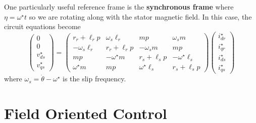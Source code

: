 \documentclass[onecolumn]{gwclass}
\begin{document}
One particularly useful reference frame is the \textbf{synchronous frame} where $\eta=\omega^\star t$ so we are rotating along with the stator magnetic field. In this case, the circuit equations become
$$ \begin{pmatrix}
	0 \\
	0\\
	v_{ds}^\star \\
	v_{qs}^\star
\end{pmatrix} = 
\begin{pmatrix}
	r_r + \ell_r p & \omega_s\ell_r & mp & \omega_sm \\
	-\omega_s \ell_r & r_r + \ell_r p & -\omega_s m & mp \\
  mp & -\omega^\star m & 	r_s + \ell_sp & -\omega^\star\ell_s\\
	\omega^\star m & mp & \omega^\star\ell_s & r_s + \ell_s p
\end{pmatrix}\begin{pmatrix}
	i_{dr}^\star\\
	i_{qr}^\star\\
	i_{ds}^\star\\
	i_{qs}^\star
\end{pmatrix}$$
where $\omega_s=\dot{\theta} - \omega^\star$ is the slip frequency.

\section{Field Oriented Control}
\end{document}
